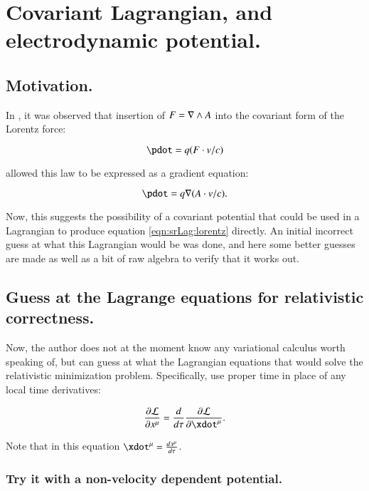 \chapter{Covariant Lagrangian, and electrodynamic potential.}\label{chap:PJSrLagrangian}

\section{Motivation. }

In \cite{PJSrGAFPLorentzForce}, it was observed that insertion of $F = \nabla \wedge A$ into
the covariant form of the Lorentz force:

\begin{equation}\label{eqn:srLag:lorentz}
\pdot = q (F \cdot v/c)
\end{equation}

allowed this law to be expressed as a gradient equation:

\begin{equation}
\pdot = q \grad (A \cdot v/c).
\end{equation}

Now, this suggests the possibility of a covariant potential that could be 
used in a Lagrangian to produce equation \ref{eqn:srLag:lorentz} directly.  An
initial incorrect guess at what this Lagrangian would be was done, and
here some better guesses are made as well as a bit of raw algebra to verify
that it works out.

\section{Guess at the Lagrange equations for relativistic correctness. }

Now, the author does not at the moment know any variational calculus worth
speaking of, but can guess at what the Lagrangian equations that would 
solve the relativistic minimization problem.  Specifically, use proper
time in place of any local time derivatives:

\begin{equation}\label{eqn:srLag:properLagrange}
\frac{\partial \mathcal{L}}{\partial x^{\mu}} = 
\frac{d}{d\tau} \frac{\partial \mathcal{L}}{\partial \xdot^{\mu}}.
\end{equation}

Note that in this equation $\xdot^{\mu} = \frac{d x^{\mu}}{d\tau}$.

\subsection{Try it with a non-velocity dependent potential. }

